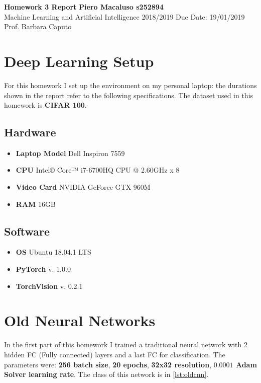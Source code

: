 \documentclass[a4paper, 11pt]{article}
\begin{document}
	\noindent
	\large\textbf{Homework 3 Report} \hfill \textbf{Piero Macaluso s252894} \\
	\normalsize Machine Learning and Artificial Intelligence 2018/2019 \hfill Due Date: 19/01/2019 \\
	Prof. Barbara Caputo  
	
	
	\section*{Deep Learning Setup}
	For this homework I set up the environment on my personal laptop: the durations shown in the report refer to the following specifications. The dataset used in this homework is \textbf{CIFAR 100}.
	\subsection*{Hardware}
	\begin{itemize}
		\item \textbf{Laptop Model} Dell Inspiron 7559
		\item \textbf{CPU} Intel® Core™ i7-6700HQ CPU @ 2.60GHz x 8 
		\item \textbf{Video Card} NVIDIA GeForce GTX 960M
		\item \textbf{RAM} 16GB
	\end{itemize}
	
	\subsection*{Software}
	\begin{itemize}
		\item \textbf{OS} Ubuntu 18.04.1 LTS
		\item \textbf{PyTorch} v. 1.0.0
		\item \textbf{TorchVision} v. 0.2.1
	\end{itemize}
	
	
	\section{Old Neural Networks} \label{oldcnn}
	
	
	
	In the first part of this homework I trained a traditional neural network with 2 hidden FC (Fully connected) layers and a last FC for classification. The parameters were: \textbf{256 batch size}, \textbf{20 epochs}, \textbf{32x32 resolution}, \textbf{$\boldsymbol{0.0001}$ Adam Solver learning rate}. The class of this network is in \vref{lst:oldcnn}.
	
\end{document}
